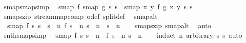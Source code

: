 \begin{isabellebody}
\endisatagproof
{\isafoldproof}%
%
\isadelimproof
\isanewline
%
\endisadelimproof
\isanewline
{}\isamarkupfalse%
\ smap{\isacharunderscore}smap{}{\isacharbrackleft}simp{\isacharbrackright}{\isacharcolon}\isanewline
\ \ {\isachardoublequoteopen}smap\ f\ {\isacharparenleft}smap{}\ g\ s{}\ s{}{\isacharparenright}\ {\isacharequal}\ smap{}\ {\isacharparenleft}{\isasymlambda}x\ y{\isachardot}\ f\ {\isacharparenleft}g\ x\ y{\isacharparenright}{\isacharparenright}\ s{}\ s{}{\isachardoublequoteclose}\isanewline
%
\isadelimproof
\ \ %
\endisadelimproof
%
\isatagproof
{}\isamarkupfalse%
\ smap{}{\isacharunderscore}szip\ stream{\isachardot}map{\isacharunderscore}comp\ o{\isacharunderscore}def\ split{\isacharunderscore}def\ \isacommand{{\isachardot}{\isachardot}}\isamarkupfalse%
%
\endisatagproof
{\isafoldproof}%
%
\isadelimproof
\isanewline
%
\endisadelimproof
\isanewline
{}\isamarkupfalse%
\ smap{}{\isacharunderscore}alt{\isacharcolon}\isanewline
\ \ {\isachardoublequoteopen}{\isacharparenleft}smap{}\ f\ s{}\ s{}\ {\isacharequal}\ s{\isacharparenright}\ {\isacharequal}\ {\isacharparenleft}{\isasymforall}n{\isachardot}\ f\ {\isacharparenleft}s{}\ {\isacharbang}{\isacharbang}\ n{\isacharparenright}\ {\isacharparenleft}s{}\ {\isacharbang}{\isacharbang}\ n{\isacharparenright}\ {\isacharequal}\ s\ {\isacharbang}{\isacharbang}\ n{\isacharparenright}{\isachardoublequoteclose}\isanewline
%
\isadelimproof
\ \ %
\endisadelimproof
%
\isatagproof
{}\isamarkupfalse%
\ smap{}{\isacharunderscore}szip\ smap{\isacharunderscore}alt\ \isamarkupfalse%
\ auto%
\endisatagproof
{\isafoldproof}%
%
\isadelimproof
\isanewline
%
\endisadelimproof
\isanewline
{}\isamarkupfalse%
\ snth{\isacharunderscore}smap{}{\isacharbrackleft}simp{\isacharbrackright}{\isacharcolon}\isanewline
\ \ {\isachardoublequoteopen}smap{}\ f\ s{}\ s{}\ {\isacharbang}{\isacharbang}\ n\ {\isacharequal}\ f\ {\isacharparenleft}s{}\ {\isacharbang}{\isacharbang}\ n{\isacharparenright}\ {\isacharparenleft}s{}\ {\isacharbang}{\isacharbang}\ n{\isacharparenright}{\isachardoublequoteclose}\isanewline
%
\isadelimproof
\ \ %
\endisadelimproof
%
\isatagproof
{}\isamarkupfalse%
\ {\isacharparenleft}induct\ n\ arbitrary{\isacharcolon}\ s{}\ s{}{\isacharparenright}\ auto%

\end{isabellebody}

